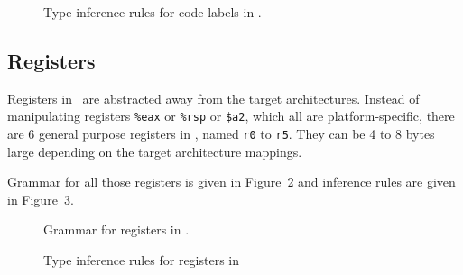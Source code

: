 \begin{figure}[H]
  \centering


  \caption{Type inference rules for code labels in \nstar.}
  \label{fig:nstar-common-expressions-labels-code-typerules}
\end{figure}

\subsection{Registers}\label{subsec:nstar-common-expressions-registers}

Registers in \nstar\ are abstracted away from the target architectures.
Instead of manipulating registers \texttt{\%eax} or \texttt{\%rsp} or \texttt{\$a2}, which all are platform-specific, there are 6 general purpose registers in \nstar, named \texttt{r0} to \texttt{r5}.
They can be 4 to 8 bytes large depending on the target architecture mappings.

Grammar for all those registers is given in Figure~\ref{fig:nstar-common-expressions-registers-grammar} and inference rules are given in Figure~\ref{fig:nstar-common-expressions-registers-typerules}.

\begin{figure}[htb]
  \centering


  \caption{Grammar for registers in \nstar.}
  \label{fig:nstar-common-expressions-registers-grammar}
\end{figure}

\begin{figure}[htb]
  \centering


  \caption{Type inference rules for registers in \nstar}
  \label{fig:nstar-common-expressions-registers-typerules}
\end{figure}

